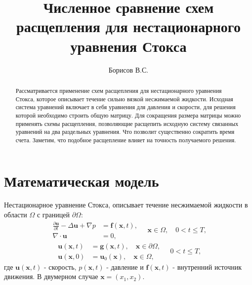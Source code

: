 \documentclass[12pt]{article}
\title{Численное сравнение схем расщепления для нестационарного уравнения Стокса}
\author{Борисов В.С.}
\begin{document}
\maketitle

\begin{abstract}
Рассматривается применение схем расщепления для нестационарного уравнения Стокса, которое описывает течение сильно вязкой несжимаемой жидкости. 
Исходная система уравнений включает в себя уравнения для давления и скорости, для решения которой необходимо строить общую матрицу. 
Для сокращения размера матрицы можно применять схемы расщепления, позволяющие расщепить исходную систему связанных уравнений на два раздельных уравнения. Что позволит существенно сократить время счета. Заметим, что подобное расщепление влияет на точность получаемого решения.
\end{abstract}

\section{Математическая модель}
Нестационарное уравнение Стокса, описывает течение несжимаемой жидкости в области $\Omega$ с границей $\partial \Omega$:
\begin{equation}
\begin{aligned}
\frac{\partial {\bm u}}{\partial t} -\Delta {\bm u} + \nabla p &= {\bm f}({\bm x}, t), \\
\nabla\cdot{\bm u} &= 0, 
\end{aligned}
\quad {\bm x} \in \Omega, \quad 0<t \leq T,
\end{equation} 
$$
\begin{aligned}
{\bm u(\bm x, t)} &= {\bm g}({\bm x}, t), \quad {\bm x} \in \partial \Omega,\\
{\bm u(\bm x, 0)} &= {\bm u_0}({\bm x}), \quad {\bm x} \in \Omega,
\end{aligned}
\quad 0<t \leq T,
$$
где ${\bm u}({\bm x}, t)$ - скорость, $p({\bm x}, t)$ - давление и ${\bm f}({\bm x}, t)$ - внутренний источник движения. В двумерном случае ${\bm x}=(x_1, x_2)$.
\end{document}
